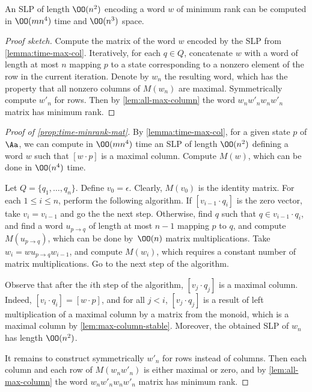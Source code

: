 \begin{prop}\label{prop:time-minrank-mat}
    An SLP of length $\OO(n^2)$ encoding a word $w$ of minimum rank can be computed in $\OO(mn^4)$ time and $\OO(n^3)$ space.
\end{prop}
\begin{proof}[Proof sketch]
 Compute the matrix of the word $w$ encoded by the SLP from \autoref{lemma:time-max-col}. Iteratively, for each $q \in Q$, concatenate $w$ with a word of length at most $n$ mapping $p$ to a state corresponding to a nonzero element of the row in the current iteration. Denote by $w_n$ the resulting word, which has the property that all nonzero columns of $M(w_n)$ are maximal. Symmetrically compute $w'_n$ for rows. Then by \autoref{lem:all-max-column} the word $w_{n}w'_{n}w_{n}w'_{n}$ matrix has minimum rank.
\end{proof}
\begin{proof}[Proof of \autoref{prop:time-minrank-mat}]
By \autoref{lemma:time-max-col},
for a given state $p$ of $\Aa$, we can compute in $\OO(mn^4)$ time an SLP of length $\OO(n^2)$ defining a word $w$ such that $[w \cdot p]$ is a maximal column. Compute $M(w)$, which can be done in  $\OO(n^4)$ time.

Let $Q = \{q_1, \ldots, q_n\}$. Define $v_0 = \epsilon$. Clearly, $M(v_0)$ is the identity matrix. 
For each $1 \le i \le n$, perform the following algorithm. If $[v_{i - 1} \cdot q_i]$ is the zero vector, take $v_i = v_{i - 1}$ and go the the next step. Otherwise, find $q$ such that $q \in v_{i - 1} \cdot q_i$, and 
find a word $u_{p \to q}$ of length at most $n - 1$ mapping $p$ to $q$, and compute $M(u_{p \to q})$, which can be done by~$\OO(n)$ matrix multiplications. Take $w_i = w u_{p \to q} w_{i - 1}$, and compute $M(w_i)$, which requires a constant number of matrix multiplications. Go to the next step of the algorithm.

Observe that after the $i$th step of the algorithm, $[v_j \cdot q_j]$ is a maximal column. Indeed, $[v_i \cdot q_i] = [w \cdot p]$, and for all $j < i$, $[v_j \cdot q_j]$ is a result of left multiplication of a maximal column by a matrix from the monoid, which is a maximal column by \autoref{lem:max-column-stable}.
Moreover, the obtained SLP of $w_{n}$ has length $\OO(n^2)$.

It remains to construct symmetrically $w'_{n}$ for rows instead of columns. Then each column and each row of $M(w_{n}w'_{n})$ is either maximal or zero, and by \autoref{lem:all-max-column} the word $w_{n}w'_{n}w_{n}w'_{n}$ matrix has minimum rank.
\end{proof}


